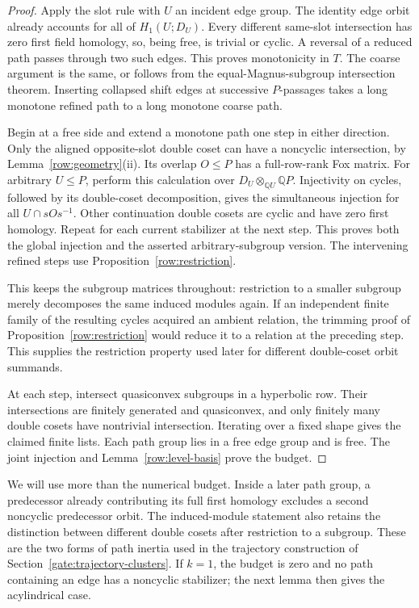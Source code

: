 \begin{proof}
Apply the slot rule with \(U\) an incident edge group. The identity
edge orbit already accounts for all of \(H_1(U;D_U)\).
Every different same-slot intersection has zero first field
homology, so, being free, is trivial or cyclic. A reversal of a
reduced path passes through two such edges. This proves monotonicity
in \(T\). The coarse argument is the same, or follows from the
equal-Magnus-subgroup intersection theorem. Inserting collapsed shift
edges at successive \(P\)-passages takes a long monotone refined
path to a long monotone coarse path.

Begin at a free side and extend a monotone path one step in either
direction. Only the aligned opposite-slot double coset can have a
noncyclic intersection, by Lemma~\ref{row:geometry}(ii).
Its overlap \(O\leq P\) has a full-row-rank Fox matrix.
For arbitrary \(U\leq P\), perform this calculation over
\(D_U\otimes_{\mathbb QU}\mathbb QP\).
Injectivity on cycles, followed by its double-coset decomposition,
gives the simultaneous injection for all
\(U\cap sOs^{-1}\). Other continuation double cosets are cyclic and
have zero first homology. Repeat for each current stabilizer at
the next step. This proves both the global injection and the
asserted arbitrary-subgroup version. The intervening refined steps
use Proposition~\ref{row:restriction}.

This keeps the subgroup matrices throughout: restriction to a
smaller subgroup merely decomposes the same induced modules again.
If an independent finite family of the resulting cycles acquired
an ambient relation, the trimming proof of
Proposition~\ref{row:restriction} would reduce it to a relation at
the preceding step. This supplies the restriction property used
later for different double-coset orbit summands.

At each step, intersect quasiconvex subgroups in a hyperbolic row.
Their intersections are finitely generated and quasiconvex, and
only finitely many double cosets have nontrivial intersection.
Iterating over a fixed shape gives the claimed finite lists.
Each path group lies in a free edge group and is free.
The joint injection and Lemma~\ref{row:level-basis} prove the budget.
\end{proof}

We will use more than the numerical budget. Inside a later path group,
a predecessor already contributing its full first homology excludes
a second noncyclic predecessor orbit. The induced-module statement
also retains the distinction between different double cosets after
restriction to a subgroup. These are the two forms of path inertia
used in the trajectory construction of Section~\ref{gate:trajectory-clusters}.
If \(k=1\), the budget is zero and no path containing an edge has a
noncyclic stabilizer; the next lemma then gives the acylindrical case.

